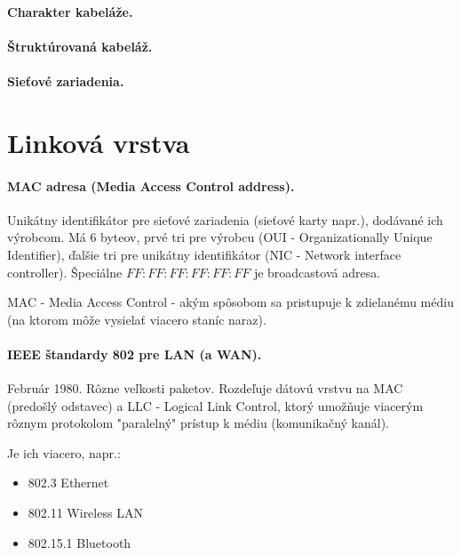 {{\paragraph{Charakter kabeláže.}     
\paragraph{Štruktúrovaná kabeláž.}  
\paragraph{Sieťové zariadenia.}            
\section{Linková vrstva}        
\paragraph{MAC adresa (Media Access Control address).}     
Unikátny identifikátor pre sieťové zariadenia (sieťové karty napr.),
dodávané ich výrobcom. Má 6 byteov, prvé tri pre výrobcu (OUI - Organizationally Unique Identifier), ďalšie tri pre unikátny identifikátor (NIC - Network interface controller). Špeciálne $FF:FF:FF:FF:FF:FF$ je broadcastová adresa. 
          
MAC -  Media Access Control - akým spôsobom sa pristupuje k zdielanému médiu (na ktorom môže vysielať viacero staníc naraz).          
\paragraph{IEEE štandardy 802 pre LAN (a WAN).}  
Február 1980. Rôzne veľkosti paketov. Rozdeľuje dátovú vrstvu na MAC  (predošlý odstavec) a LLC - Logical Link Control, ktorý umožňuje viacerým rôznym protokolom "paralelný" prístup k médiu (komunikačný kanál).

Je ich viacero, napr.:
\begin{itemize}
\item 802.3 Ethernet      
\item 802.11 Wireless LAN
\item 802.15.1 Bluetooth 
\end{itemize}

}}
